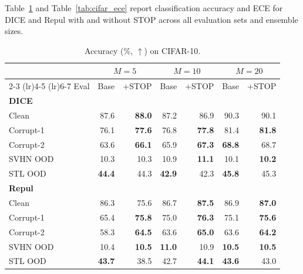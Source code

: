 \documentclass[sigconf]{acmart}
\begin{document}
Table~\ref{tab:cifar_acc} and Table~\ref{tab:cifar_ece} report classification accuracy and ECE for DICE and Repul with and without STOP across all evaluation sets and ensemble sizes.

\begin{table}[!ht]
\centering
\caption{Accuracy (\%, $\uparrow$) on CIFAR-10.}
\label{tab:cifar_acc}
\scriptsize
\begin{tabular}{lrrrrrr}
\toprule
& \multicolumn{2}{c}{$M=5$} 
& \multicolumn{2}{c}{$M=10$} 
& \multicolumn{2}{c}{$M=20$} \\
\cmidrule(lr){2-3} \cmidrule(lr){4-5} \cmidrule(lr){6-7}
Eval
& Base & +STOP
& Base & +STOP
& Base & +STOP \\
\midrule

\multicolumn{7}{l}{\textbf{DICE}} \\
Clean     & 87.6 & \textbf{88.0} & 87.2 & 86.9 & 90.3 & 90.1 \\
Corrupt-1 & 76.1 & \textbf{77.6} & 76.8 & \textbf{77.8} & 81.4 & \textbf{81.8} \\
Corrupt-2 & 63.6 & \textbf{66.1} & 65.9 & \textbf{67.3} & \textbf{68.8} & 68.7 \\
SVHN OOD  & 10.3 & 10.3 & 10.9 & \textbf{11.1} & 10.1 & \textbf{10.2} \\
STL OOD   & \textbf{44.4} & 44.3 & \textbf{42.9} & 42.3 & \textbf{45.8} & 45.3 \\

\midrule

\multicolumn{7}{l}{\textbf{Repul}} \\
Clean     & 86.3 & 75.6 & 86.7 & \textbf{87.5} & 86.9 & \textbf{87.0} \\
Corrupt-1 & 65.4 & \textbf{75.8} & 75.0 & \textbf{76.3} & 75.1 & \textbf{75.6} \\
Corrupt-2 & 58.3 & \textbf{64.5} & 63.6 & \textbf{65.0} & 63.6 & \textbf{64.2} \\
SVHN OOD  & 10.4 & \textbf{10.5} & \textbf{11.0} & 10.9 & \textbf{10.5} & \textbf{10.5} \\
STL OOD   & \textbf{43.7} & 38.5 & 42.7 & \textbf{44.1} & \textbf{43.6} & 43.0 \\

\bottomrule
\end{tabular}
\end{table}
\end{document}
